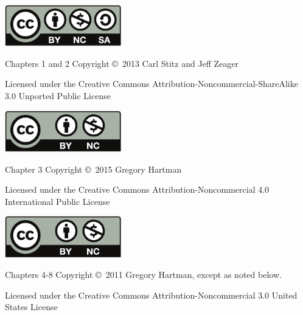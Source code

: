 \noindent\hskip -1in\begin{minipage}{2.2in}
\begin{center}
\includegraphics[width=2in]{figures/license}
\end{center}
\end{minipage}
\begin{minipage}{3.3in}
Chapters 1 and 2 Copyright \copyright\ 2013 Carl Stitz and Jeff Zeager

Licensed under the Creative Commons Attribution-Noncommercial-ShareAlike 3.0 Unported Public License
\end{minipage}

\bigskip

\bigskip

\bigskip


\noindent\hskip-1in\begin{minipage}{2.2in}
\begin{center}
\includegraphics[width=2in]{text/by-nc} 
\end{center}
\end{minipage}
\begin{minipage}{3.3in}
Chapter 3 Copyright \copyright\ 2015 Gregory Hartman

Licensed under the Creative Commons Attribution-Noncommercial 4.0 International Public License
\end{minipage}

\bigskip

\bigskip

\bigskip

\noindent\hskip-1in\begin{minipage}{2.2in}
\begin{center}
\includegraphics[width=2in]{text/by-nc}
\end{center}
\end{minipage}
\begin{minipage}{3.3in}
Chapters 4-8 Copyright \copyright\ 2011 Gregory Hartman, except as noted below.

Licensed under the Creative Commons Attribution-Noncommercial 3.0 United States License
\end{minipage}

